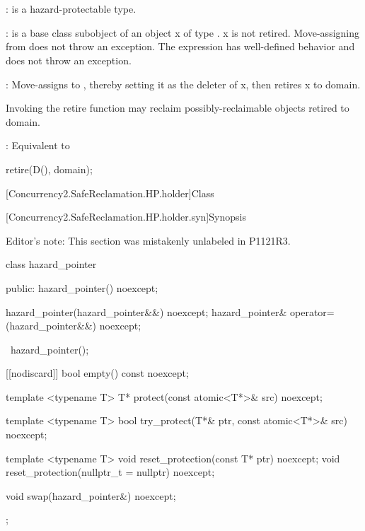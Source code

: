 \\
\hspace*{1.1em}\\
\hspace*{1.1em}

\pnum
{}:  is a hazard-protectable type.

\pnum
{}:  is a base class subobject of an object x of type . x is not retired.
Move-assigning  from  does not throw an exception. The expression  has well-defined behavior and does not throw an exception.

\pnum
{}: Move-assigns  to , thereby setting it as the deleter of x, then retires x
to domain.

\pnum
Invoking the retire function may reclaim possibly-reclaimable objects retired to domain.
\\


\pnum
{}: Equivalent to
\begin{codeblock}
retire(D(), domain);
\end{codeblock}

[Concurrency2.SafeReclamation.HP.holder]{Class }

[Concurrency2.SafeReclamation.HP.holder.syn]{Synopsis}

Editor's note: This section was mistakenly unlabeled in P1121R3.

\begin{codeblock}
class hazard_pointer {
public:
  hazard_pointer() noexcept;

  hazard_pointer(hazard_pointer&&) noexcept;
  hazard_pointer& operator=(hazard_pointer&&) noexcept;

  ~hazard_pointer();
  
  [[nodiscard]] bool empty() const noexcept;
  
  template <typename T> T* protect(const atomic<T*>& src) noexcept;
  
  template <typename T> bool try_protect(T*& ptr, const atomic<T*>& src) noexcept;
  
  template <typename T> void reset_protection(const T* ptr) noexcept;
  void reset_protection(nullptr_t = nullptr) noexcept;
  
  void swap(hazard_pointer&) noexcept;
};
\end{codeblock}

